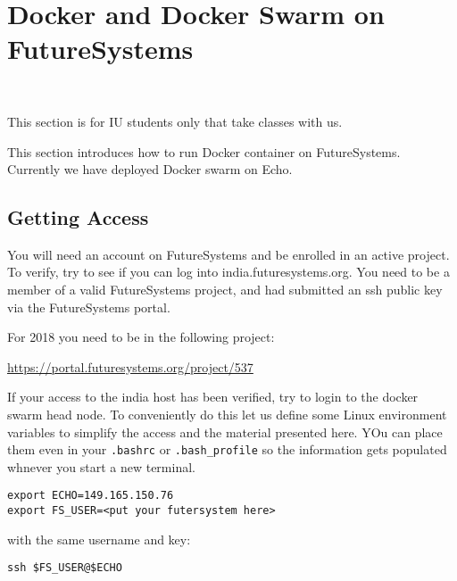 
\chapter{Docker and Docker Swarm on FutureSystems}\label{S:docker-fg}

\FILENAME\

\begin{IU}

This section is for IU students only that take classes with us.
\end{IU}

This section introduces how to run Docker container on
FutureSystems. Currently we have deployed Docker swarm on Echo.

\section{Getting Access}

You will need an account on FutureSystems and be enrolled in an active
project.  To verify, try to see if you can log into
india.futuresystems.org. You need to be a member of a valid
FutureSystems project, and had submitted an ssh public key via the
FutureSystems portal.

\begin{IU}
For 2018 you need to be in the following project:

\url{https://portal.futuresystems.org/project/537}

\end{IU}

If your access to the india host has been verified, try to login to
the docker swarm head node. To conveniently do this let us define some
Linux environment variables to simplify the access and the material
presented here. YOu can place them even in your \verb|.bashrc| or
\verb|.bash_profile| so the information gets populated whnever you start a
new terminal.

\begin{lstlisting}
export ECHO=149.165.150.76
export FS_USER=<put your futersystem here>
\end{lstlisting}


with the same username and key:

\begin{lstlisting}
ssh $FS_USER@$ECHO
\end{lstlisting}

